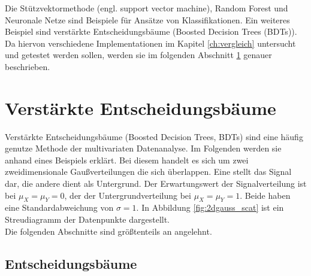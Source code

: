 Die St\"utzvektormethode (engl. support vector machine), Random Forest und Neuronale Netze sind Beispiele f\"ur Ans\"atze von Klassifikationen. 
Ein weiteres Beispiel sind verst\"arkte Entscheidungsb\"aume (Boosted Decision Trees (BDTs)). Da hiervon verschiedene Implementationen im Kapitel \ref{ch:vergleich} untersucht und getestet werden sollen, werden sie im folgenden Abschnitt \ref{ch:Algorithmen:sec:BDT} genauer beschrieben.

\section{Verst\"arkte Entscheidungsb\"aume}
\label{ch:Algorithmen:sec:BDT}

Verst\"arkte Entscheidungsb\"aume (Boosted Decision Trees, BDTs) sind eine h\"aufig genutze Methode der multivariaten Datenanalyse. Im Folgenden werden sie anhand eines Beispiels erkl\"art. Bei diesem handelt es sich um zwei zweidimensionale Gau\ss verteilungen die sich \"uberlappen. Eine stellt das Signal dar, die andere dient als Untergrund. Der Erwartungswert der Signalverteilung ist bei $\mu_X=\mu_Y=0$, der der Untergrundverteilung bei $\mu_X=\mu_Y=1$. Beide haben eine Standardabweichung von $\sigma=1$. In Abbildung \ref{fig:2dgauss_scat} ist ein Streudiagramm der Datenpunkte dargestellt.\\
Die folgenden Abschnitte sind gr\"o\ss tenteils an \cite{SWB-307748006} angelehnt.

\subsection{Entscheidungsb\"aume}
\label{ch:Algorithmen:subsec:Entscheidungsbaum}

